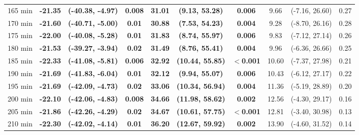 \begin{table}[ht]
{\begin{tabular}{lccccccccc}
165 min & \textbf{-21.35} & \textbf{(-40.38, -4.97)} & \textbf{0.008} & \textbf{31.01} & \textbf{(9.13, 53.28)} & \textbf{0.006} & 9.66 & (-7.16, 26.60) & 0.27 \\
170 min & \textbf{-21.60} & \textbf{(-40.71, -5.00)} & \textbf{0.01} & \textbf{30.88} & \textbf{(7.53, 54.23)} & \textbf{0.004} & 9.28 & (-8.70, 26.16) & 0.28 \\
175 min & \textbf{-22.00} & \textbf{(-40.08, -5.28)} & \textbf{0.01} & \textbf{31.83} & \textbf{(8.74, 55.97)} & \textbf{0.006} & 9.83 & (-7.12, 27.14) & 0.26 \\
180 min & \textbf{-21.53} & \textbf{(-39.27, -3.94)} & \textbf{0.02} & \textbf{31.49} & \textbf{(8.76, 55.41)} & \textbf{0.004} & 9.96 & (-6.36, 26.66) & 0.25 \\
185 min & \textbf{-22.33} & \textbf{(-41.08, -5.81)} & \textbf{0.006} & \textbf{32.92} & \textbf{(10.44, 55.85)} & \textbf{$<$0.001} & 10.60 & (-7.37, 27.98) & 0.21 \\
190 min & \textbf{-21.69} & \textbf{(-41.83, -6.04)} & \textbf{0.01} & \textbf{32.12} & \textbf{(9.94, 55.07)} & \textbf{0.006} & 10.43 & (-6.12, 27.17) & 0.22 \\
195 min & \textbf{-21.69} & \textbf{(-42.09, -4.73)} & \textbf{0.02} & \textbf{33.06} & \textbf{(10.34, 56.94)} & \textbf{0.004} & 11.36 & (-5.19, 28.89) & 0.20 \\
200 min & \textbf{-22.10} & \textbf{(-42.06, -4.83)} & \textbf{0.008} & \textbf{34.66} & \textbf{(11.98, 58.62)} & \textbf{0.002} & 12.56 & (-4.30, 29.17) & 0.16 \\
205 min & \textbf{-21.86} & \textbf{(-42.26, -4.29)} & \textbf{0.02} & \textbf{34.67} & \textbf{(10.61, 57.75)} & \textbf{$<$0.001} & 12.81 & (-3.40, 30.98) & 0.13 \\
210 min & \textbf{-22.30} & \textbf{(-42.02, -4.14)} & \textbf{0.01} & \textbf{36.20} & \textbf{(12.67, 59.92)} & \textbf{0.002} & 13.90 & (-4.60, 31.52) & 0.14 \\
\bottomrule
\end{tabular}%
}
\end{table}
